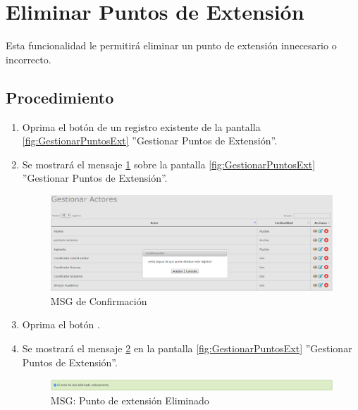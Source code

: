 \hypertarget{cv:eliminarPExt}{\section{Eliminar Puntos de Extensión}} \label{sec:eliminarPExt}

	Esta funcionalidad le permitirá eliminar un punto de extensión innecesario o incorrecto. 

		\subsection{Procedimiento}

			\begin{enumerate}
	
			\item Oprima el botón \IUBotonEliminar{} de un registro existente de la pantalla \ref{fig:GestionarPuntosExt} ''Gestionar Puntos de Extensión''.
	
			\item Se mostrará el mensaje \ref{fig:confirmaEliminaPExt} sobre la pantalla \ref{fig:GestionarPuntosExt} ''Gestionar Puntos de Extensión''.
			
			\begin{figure}[htbp!]
				\begin{center}
					\includegraphics[scale=0.5]{roles/lider/actor/pantallas/IU10-3MSG10}
					\caption{MSG de Confirmación}
					\label{fig:confirmaEliminaPExt}
				\end{center}
			\end{figure}
						
			\item Oprima el botón \IUAceptar.
			
			\item Se mostrará el mensaje \ref{fig:PExtEliminado} en la pantalla \ref{fig:GestionarPuntosExt} ''Gestionar Puntos de Extensión''.
			
			\begin{figure}[htbp!]
				\begin{center}
					\includegraphics[scale=0.5]{roles/lider/actor/pantallas/IU10-3MSG1}
					\caption{MSG: Punto de extensión Eliminado}
					\label{fig:PExtEliminado}
				\end{center}
			\end{figure}
			\end{enumerate}